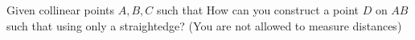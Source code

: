 Given collinear points $A,B,C$ such that  How can you construct a point $D$ on $AB$ such that  using only a straightedge? (You are not allowed to measure distances)